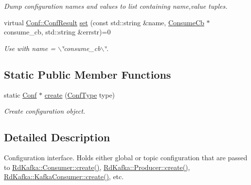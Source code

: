 \begin{DoxyCompactItemize}
\begin{DoxyCompactList}\small\item\em Dump configuration names and values to list containing name,value tuples. \item\end{DoxyCompactList}\item 
\hypertarget{classRdKafka_1_1Conf_a714e2cd04cd163ee1dfa6ef3b12cecc7}{
virtual \hyperlink{classRdKafka_1_1Conf_a1d023a689c09f42ab18b7bd1d15a11a6}{Conf::ConfResult} \hyperlink{classRdKafka_1_1Conf_a714e2cd04cd163ee1dfa6ef3b12cecc7}{set} (const std::string \&name, \hyperlink{classRdKafka_1_1ConsumeCb}{ConsumeCb} $\ast$consume\_\-cb, std::string \&errstr)=0}
\label{classRdKafka_1_1Conf_a714e2cd04cd163ee1dfa6ef3b12cecc7}

\begin{DoxyCompactList}\small\item\em Use with {\ttfamily name} = {\ttfamily $\backslash$\char`\"{}consume\_\-cb$\backslash$\char`\"{}}. \item\end{DoxyCompactList}\end{DoxyCompactItemize}
\subsection*{Static Public Member Functions}
\begin{DoxyCompactItemize}
\item 
\hypertarget{classRdKafka_1_1Conf_a3b462e1852939d9f6fdc6f20a23a838d}{
static \hyperlink{classRdKafka_1_1Conf}{Conf} $\ast$ \hyperlink{classRdKafka_1_1Conf_a3b462e1852939d9f6fdc6f20a23a838d}{create} (\hyperlink{classRdKafka_1_1Conf_a118f3a1435b5379ec999daac9d84f001}{ConfType} type)}
\label{classRdKafka_1_1Conf_a3b462e1852939d9f6fdc6f20a23a838d}

\begin{DoxyCompactList}\small\item\em Create configuration object. \item\end{DoxyCompactList}\end{DoxyCompactItemize}


\subsection{Detailed Description}
Configuration interface. Holds either global or topic configuration that are passed to \hyperlink{classRdKafka_1_1Consumer_aaa4fdf4ec84bbe40561f7b3d5676c065}{RdKafka::Consumer::create()}, \hyperlink{classRdKafka_1_1Producer_a540569ee0152703cdad4b45419f64b39}{RdKafka::Producer::create()}, \hyperlink{classRdKafka_1_1KafkaConsumer_ac32a5eb3474b3315635cb1d39794d068}{RdKafka::KafkaConsumer::create()}, etc.

